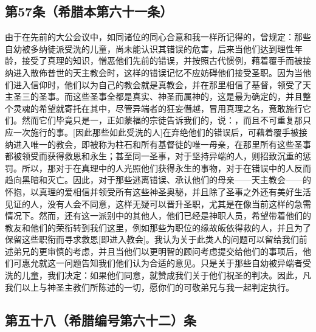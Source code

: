 \par


\subsection{第57条（希腊本第六十一条）}

\par

由于在先前的大公会议中，如同诸位的同心合意和我一样所记得的，曾规定：那些自幼被多纳徒派受洗的儿童，尚未能认识其错误的危害，后来当他们达到理性年龄，接受了真理的知识，憎恶他们先前的错误，并按照古代惯例，藉着覆手而被接纳进入散佈普世的天主教会时，这样的错误记忆不应妨碍他们接受圣职。因为当他们进入信仰时，他们以为自己的教会就是真教会，并在那里相信了基督，领受了天主圣三的圣事。而这些圣事全都是真实、神圣而属神的，这是最为确定的，并且整个灵魂的希望就寄托在其中，尽管异端者的狂妄僭越，冒用真理之名，竟敢施行它们。然而它们毕竟只是一，正如蒙福的宗徒告诉我们的，说：，而且不可重复那只应一次施行的事。[因此那些如此受洗的人]在弃绝他们的错误后，可藉着覆手被接纳进入唯一的教会，即被称为柱石和所有基督徒的唯一母亲，在那里所有这些圣事都被领受而获得救恩和永生；甚至同一圣事，对于坚持异端的人，则招致沉重的惩罚。所以，那对于在真理中的人光照他们获得永生的事物，对于在错误中的人反而趋向黑暗和灭亡。因此，对于那些逃离错误、承认他们的母亲——天主教会——的怀抱，以真理的爱相信并领受所有这些神圣奥秘，并且除了圣事之外还有美好生活见证的人，没有人会不同意，这样无疑可以晋升圣职，尤其是在像当前这样的急需情况下。然而，还有这一派别中的其他人，他们已经是神职人员，希望带着他们的教友和他们的荣衔转到我们这里，例如那些为职位的缘故皈依得救的人，并且为了保留这些职衔而寻求救恩[即进入教会]。我认为关于此类人的问题可以留给我们前述弟兄的更审慎的考虑，并且当他们以更明智的顾问考虑提交给他们的事项后，他们可惠允就这一问题告知我们他们认为合适的意见。只是关于那些自幼被异端者受洗的儿童，我们决定：如果他们同意，就赞成我们关于他们祝圣的判决。因此，凡我们以上与神圣主教们所陈述的一切，愿你们的可敬弟兄与我一起判定执行。\par


\subsection{第五十八（希腊编号第六十二）条}

